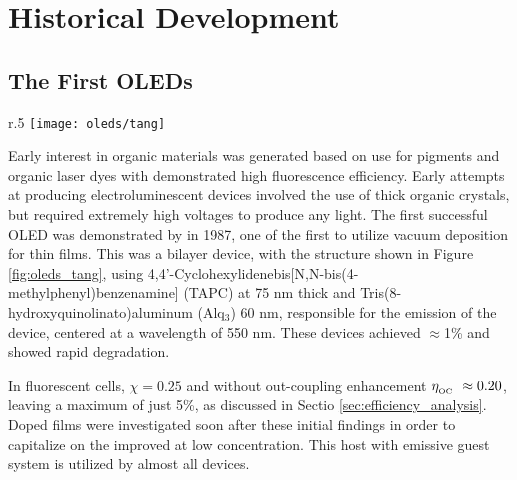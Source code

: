 \documentclass[../thesis.tex]{subfiles}
\begin{document}
\newpage
\section{Historical Development}\label{sec:oled_history}
\subsection{The First OLEDs}

\begin{wrapfigure}{r}{.5\textwidth}
\texttt{[image: oleds/tang]}
\caption{Structure of the first OLED cell from \textcite{Tang1987}.  Diamine is commonly referred to now as TAPC.}
\label{fig:oleds_tang}
\end{wrapfigure}

Early interest in organic materials was generated based on use for pigments and organic laser dyes with demonstrated high fluorescence efficiency.\supercite{Venkataraman1971,Schafer1977,Dresner1969}
Early attempts at producing electroluminescent devices involved the use of thick organic crystals, but required extremely high voltages to produce any light.\supercite{Williams1970,Helfrich1965}
The first successful OLED was demonstrated by \textcite{Tang1987} in 1987, one of the first to utilize vacuum deposition for thin films.
This was a bilayer device, with the structure shown in Figure \ref{fig:oleds_tang}, using 4,4'-Cyclohexylidenebis[N,N-bis(4-methylphenyl)benzenamine] (TAPC) at 75 nm thick and Tris(8-hydroxyquinolinato)aluminum (Alq$_3$) 60 nm, responsible for the emission of the device, centered at a wavelength of 550 nm.
These devices achieved \eqe $\approx$1\% and showed rapid degradation.

In fluorescent cells, $\chi=0.25$ and without out-coupling enhancement $\eta_{_\text{\tiny OC}}\  \approx 0.20$, leaving a maximum \eqe of just 5\%, as discussed in Sectio \ref{sec:efficiency_analysis}.
Doped films were investigated soon after these initial findings in order to capitalize on the improved \pl at low concentration.\supercite{Tang1989a}
This host with emissive guest system is utilized by almost all devices.
\end{document}
